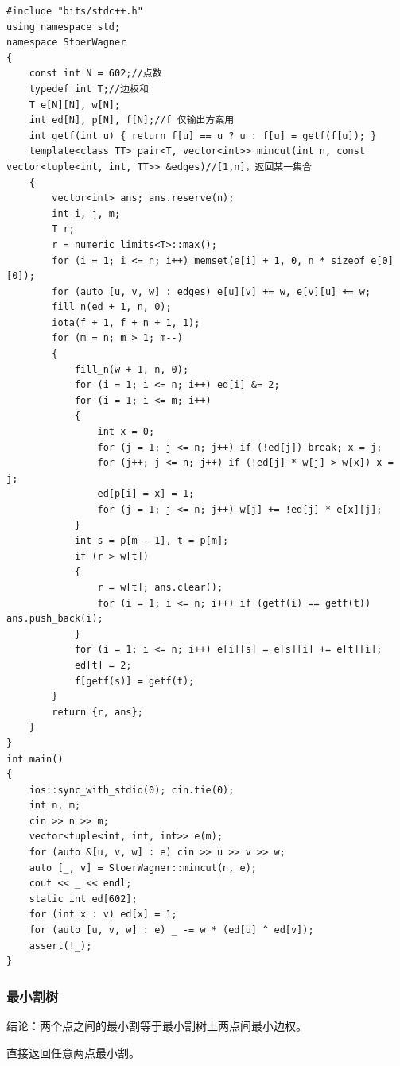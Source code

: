 \documentclass[12pt]{ctexart}
\begin{document}
\begin{lstlisting}
#include "bits/stdc++.h"
using namespace std;
namespace StoerWagner
{
	const int N = 602;//点数
	typedef int T;//边权和
	T e[N][N], w[N];
	int ed[N], p[N], f[N];//f 仅输出方案用
	int getf(int u) { return f[u] == u ? u : f[u] = getf(f[u]); }
	template<class TT> pair<T, vector<int>> mincut(int n, const vector<tuple<int, int, TT>> &edges)//[1,n]，返回某一集合
	{
		vector<int> ans; ans.reserve(n);
		int i, j, m;
		T r;
		r = numeric_limits<T>::max();
		for (i = 1; i <= n; i++) memset(e[i] + 1, 0, n * sizeof e[0][0]);
		for (auto [u, v, w] : edges) e[u][v] += w, e[v][u] += w;
		fill_n(ed + 1, n, 0);
		iota(f + 1, f + n + 1, 1);
		for (m = n; m > 1; m--)
		{
			fill_n(w + 1, n, 0);
			for (i = 1; i <= n; i++) ed[i] &= 2;
			for (i = 1; i <= m; i++)
			{
				int x = 0;
				for (j = 1; j <= n; j++) if (!ed[j]) break; x = j;
				for (j++; j <= n; j++) if (!ed[j] * w[j] > w[x]) x = j;
				ed[p[i] = x] = 1;
				for (j = 1; j <= n; j++) w[j] += !ed[j] * e[x][j];
			}
			int s = p[m - 1], t = p[m];
			if (r > w[t])
			{
				r = w[t]; ans.clear();
				for (i = 1; i <= n; i++) if (getf(i) == getf(t)) ans.push_back(i);
			}
			for (i = 1; i <= n; i++) e[i][s] = e[s][i] += e[t][i];
			ed[t] = 2;
			f[getf(s)] = getf(t);
		}
		return {r, ans};
	}
}
int main()
{
	ios::sync_with_stdio(0); cin.tie(0);
	int n, m;
	cin >> n >> m;
	vector<tuple<int, int, int>> e(m);
	for (auto &[u, v, w] : e) cin >> u >> v >> w;
	auto [_, v] = StoerWagner::mincut(n, e);
	cout << _ << endl;
	static int ed[602];
	for (int x : v) ed[x] = 1;
	for (auto [u, v, w] : e) _ -= w * (ed[u] ^ ed[v]);
	assert(!_);
}

\end{lstlisting}

\subsubsection{最小割树}

结论：两个点之间的最小割等于最小割树上两点间最小边权。

直接返回任意两点最小割。
\end{document}
